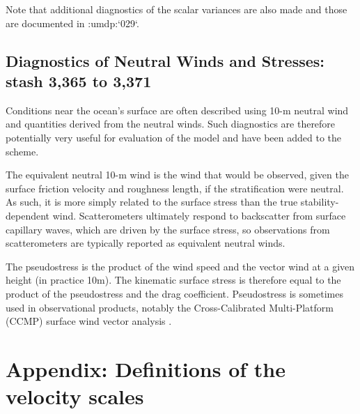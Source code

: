 \documentclass{UMDP_article}
\newcommand{\citeumdp}[1]{:umdp:`#1`}
\begin{document}
Note that additional diagnostics of the scalar variances are also made and those
are documented in \citeumdp{029}.

\subsection{Diagnostics of Neutral Winds and Stresses: stash 3,365 to 3,371}
\label{app:neutwind}

Conditions near the ocean's surface are often described using 10-m
neutral wind and quantities derived from the neutral winds. Such
diagnostics are therefore potentially very useful for evaluation of
the model and have been added to the scheme.

The equivalent neutral 10-m wind is the wind that would be observed,
given the surface friction velocity and roughness length, if the
stratification were neutral. As such, it is more simply related to the
surface stress than the true stability-dependent wind. Scatterometers
ultimately respond to backscatter from surface capillary waves, which
are driven by the surface stress, so observations from scatterometers
are typically reported as equivalent neutral winds.

The pseudostress is the product of the wind speed and the vector wind
at a given height (in practice 10m). The kinematic surface stress is
therefore equal to the product of the pseudostress and the drag
coefficient. Pseudostress is sometimes used in observational products,
notably the Cross-Calibrated Multi-Platform (CCMP) surface wind vector
analysis \cite[]{atlas2011}.

 
\section{Appendix: Definitions of the velocity scales}
\label{app:vscales}
 
\end{document}
